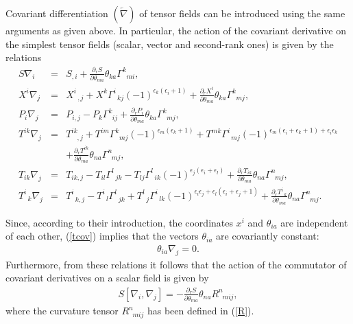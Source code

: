 \documentclass[a4paper,11pt]{article}
\begin{document}
Covariant differentiation $(\overleftarrow{\nabla })$ of tensor fields can
be introduced using the same arguments as given above. In particular, the
action of the covariant derivative on the simplest tensor fields (scalar,
vector and second-rank ones) is given by the relations
\begin{eqnarray}
\label{simple} S\nabla_i&=&S_{,i}+
\frac{\partial_r S}{\partial\theta_{ma}}\theta_{ka}\Gamma^k_{\;\;mi},\\
X^i\nabla_j&=&X^i_{\;\;,j}+ X^k\Gamma^i_{\;\;kj}
(-1)^{\epsilon_k(\epsilon_i+1)}+
\frac{\partial_r X^i}{\partial\theta_{ma}}\theta_{ka}\Gamma^k_{\;\;mj},\\
\label{tcov} P_i\nabla_j&=&P_{i,j}-P_k\Gamma^k_{\;\;ij}+
\frac{\partial_r P_i}{\partial\theta_{ma}}\theta_{ka}\Gamma^k_{\;\;mj}, \\
\nonumber
T^{ik}\nabla_j&=&
T^{ik}_{\;\;\;,j} +
T^{im}\Gamma^k_{\;\;mj}(-1)^{\epsilon_m(\epsilon_k+1)}+
T^{mk}\Gamma^i_{\;\;mj}
(-1)^{\epsilon_m(\epsilon_i+\epsilon_k+1)+\epsilon_i\epsilon_k}\\
&&+\frac{\partial_r T^{ik}}{\partial\theta_{ma}}
\theta_{na}\Gamma^n_{\;\;mj},\\
T_{ik}\nabla_j&=&
T_{ik,j} -T_{il}\Gamma^l_{\;\;jk}-
T_{lj}\Gamma^l_{\;\;ik}
(-1)^{\epsilon_j(\epsilon_i+\epsilon_l)}+
\frac{\partial_r T_{ik}}{\partial\theta_{ma}}\theta_{na}\Gamma^n_{\;\;mj},\\
T^i_{\;\;k}\nabla_j&=&
T^i_{\;\;k,j}-
T^i_{\;\;l}\Gamma^l_{\;\;jk}
+T^l_{\;\;j}\Gamma^i_{\;\;lk}
(-1)^{\epsilon_i\epsilon_j+\epsilon_l(\epsilon_i+\epsilon_j+1)}+
\frac{\partial_r T^i_{\;\;k}}{\partial\theta_{ma}}
\theta_{na}\Gamma^n_{\;\;mj}.
\end{eqnarray}

Since, according to their introduction, the coordinates $x^{i}$ and $\theta
_{ia}$ are independent of each other, (\ref{tcov}) implies that the vectors $%
\theta _{ia}$ are covariantly constant:
\begin{eqnarray}
\label{thecov}
\theta_{ia}\nabla_j=0.
\end{eqnarray}
Furthermore, from these relations it follows that the action of the
commutator of covariant derivatives on a scalar field is given by
\begin{eqnarray}
S[\nabla_i,\nabla_j]=- \frac{\partial_r S}{\partial
\theta_{ma}}\theta_{na}R^n_{\;\;mij},
\end{eqnarray}
where the curvature tensor $R_{\;\;mij}^{n}$ has been defined in (\ref{R}).
\end{document}
